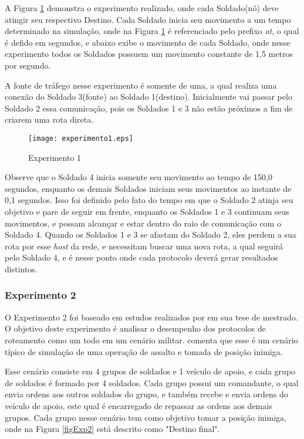 A Figura \ref{figExp1} demonstra o experimento realizado, onde cada Soldado(n\'o) deve atingir seu respectivo Destino.
Cada Soldado inicia seu movimento a um tempo determinado na simula\c{c}\~ao, onde na Figura \ref{figExp1} \'e referenciado pelo prefixo \textit{at}, o qual \'e defido em segundos, e abaixo exibe o movimento de cada Soldado, onde nesse experimento todos os Soldados possuem um movimento constante de 1,5 metros por segundo. 

A fonte de tr\'afego nesse experimento \'e somente de uma, a qual realiza uma conex\~ao do Soldado 3(fonte) ao Soldado 1(destino). Inicialmente vai passar pelo Soldado 2 essa comunica\c{c}\~ao, pois os Soldados 1 e 3 n\~ao est\~ao pr\'oximos a fim de criarem uma rota direta.

\begin{figure}[H]
	\centering
	\texttt{[image: experimento1.eps]}
	\caption{Experimento 1}
	\label{figExp1}
\end{figure}

Observe que o Soldado 4 inicia somente seu movimento ao tempo de 150,0 segundos, enquanto os demais Soldados iniciam seus movimentos ao instante de 0,1 segundos.
Isso foi definido pelo fato do tempo em que o Soldado 2 atinja seu objetivo e pare de seguir em frente, enquanto os Soldados 1 e 3 continuam seus movimentos, e possam alcan\c{c}ar e estar dentro do raio de comunica\c{c}\~ao com o Soldado 4.
Quando os Soldados 1 e 3 se afastam do Soldado 2, eles perdem a sua rota por esse \textit{host} da rede, e necessitam buscar uma nova rota, a qual seguir\'a pelo Soldado 4, e \'e nesse ponto onde cada protocolo dever\'a gerar resultados distintos.

\subsubsection{Experimento 2}
O Experimento 2 foi baseado em estudos realizados por \cite{pereira} em sua tese de mestrado. 
O objetivo deste experimento \'e analisar o desempenho dos protocolos de roteamento como um todo em um cen\'ario militar. 
\cite{pereira} comenta que esse \'e um cen\'ario t\'ipico de simula\c{c}\~ao de uma opera\c{c}\~ao de assalto e tomada de posi\c{c}\~ao inimiga.

Esse cen\'ario consiste em 4 grupos de soldados e 1 ve\'iculo de apoio, e cada grupo de soldados \'e formado por 4 soldados.
Cada grupo possui um comandante, o qual envia ordens aos outros soldados do grupo, e tamb\'em recebe e envia ordens do ve\'iculo de apoio, este qual \'e encarregado de repassar as ordens aos demais grupos.
Cada grupo nesse cen\'ario tem como objetivo tomar a posi\c{c}\~ao inimiga, onde na Figura \ref{figExp2} est\'a descrito como "Destino final".

